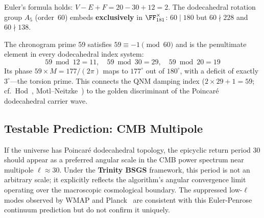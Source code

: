 Euler's formula holds: $V - E + F = 20 - 30 + 12 = 2$. The dodecahedral rotation group $A_5$ (order~60) embeds \textbf{exclusively} in $\FF_{181}^{\times}$: $60 \mid 180$ but $60 \nmid 228$ and $60 \nmid 138$.

The chronogram prime 59 satisfies $59 \equiv -1 \pmod{60}$ and is the penultimate element in every dodecahedral index system:
\begin{equation}
    59 \bmod 12 = 11, \quad 59 \bmod 30 = 29, \quad 59 \bmod 20 = 19
\end{equation}
Its phase $59 \times M = 177/(2\pi)$ maps to $177^{\circ}$ out of $180^{\circ}$, with a deficit of exactly $3^{\circ}$---the torsion prime. This connects the QNM damping index ($2 \times 29 + 1 = 59$; cf.\ Hod~\cite{hod1998}, Motl--Neitzke~\cite{motl2003}) to the golden discriminant of the Poincar\'{e} dodecahedral carrier wave.

\subsection{Testable Prediction: CMB Multipole}

If the universe has Poincar\'{e} dodecahedral topology, the epicyclic return period $30$ should appear as a preferred angular scale in the CMB power spectrum near multipole $\ell \approx 30$. Under the \textbf{Trinity BSGS} framework, this period is not an arbitrary scale; it explicitly reflects the algorithm's angular convergence limit operating over the macroscopic cosmological boundary. The suppressed low-$\ell$ modes observed by WMAP and Planck~\cite{planck2020} are consistent with this Euler-Penrose continuum prediction but do not confirm it uniquely.


